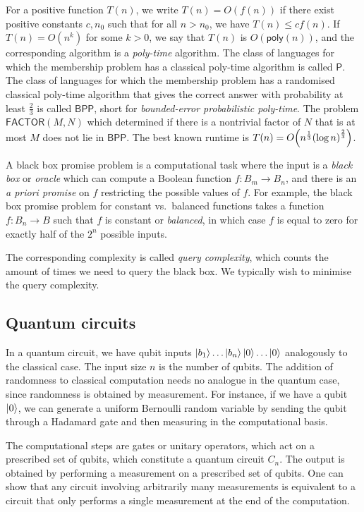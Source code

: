 For a positive function \( T(n) \), we write \( T(n) = O(f(n)) \) if there exist positive constants \( c, n_0 \) such that for all \( n > n_0 \), we have \( T(n) \leq cf(n) \).
If \( T(n) = O(n^k) \) for some \( k > 0 \), we say that \( T(n) \) is \( O(\mathsf{poly}(n)) \), and the corresponding algorithm is a \emph{poly-time} algorithm.
The class of languages for which the membership problem has a classical poly-time algorithm is called \( \mathsf{P} \).
The class of languages for which the membership problem has a randomised classical poly-time algorithm that gives the correct answer with probability at least \( \frac{2}{3} \) is called \( \mathsf{BPP} \), short for \emph{bounded-error probabilistic poly-time}.
The problem \( \mathsf{FACTOR}(M,N) \) which determined if there is a nontrivial factor of \( N \) that is at most \( M \) does not lie in \( \mathsf{BPP} \).
The best known runtime is \( T(n) = O\qty(n^{\frac{1}{3}}\qty(\log n)^\frac{2}{3}) \).

A black box promise problem is a computational task where the input is a \emph{black box} or \emph{oracle} which can compute a Boolean function \( f \colon B_m \to B_n \), and there is an \emph{a priori promise} on \( f \) restricting the possible values of \( f \).
For example, the black box promise problem for constant vs.\ balanced functions takes a function \( f \colon B_n \to B \) such that \( f \) is constant or \emph{balanced}, in which case \( f \) is equal to zero for exactly half of the \( 2^n \) possible inputs.

The corresponding complexity is called \emph{query complexity}, which counts the amount of times we need to query the black box.
We typically wish to minimise the query complexity.

\subsection{Quantum circuits}
In a quantum circuit, we have qubit inputs \( \ket{b_1} \dots \ket{b_n} \ket{0} \dots \ket{0} \) analogously to the classical case.
The input size \( n \) is the number of qubits.
The addition of randomness to classical computation needs no analogue in the quantum case, since randomness is obtained by measurement.
For instance, if we have a qubit \( \ket{0} \), we can generate a uniform Bernoulli random variable by sending the qubit through a Hadamard gate and then measuring in the computational basis.

The computational steps are gates or unitary operators, which act on a prescribed set of qubits, which constitute a quantum circuit \( C_n \).
The output is obtained by performing a measurement on a prescribed set of qubits.
One can show that any circuit involving arbitrarily many measurements is equivalent to a circuit that only performs a single measurement at the end of the computation.

